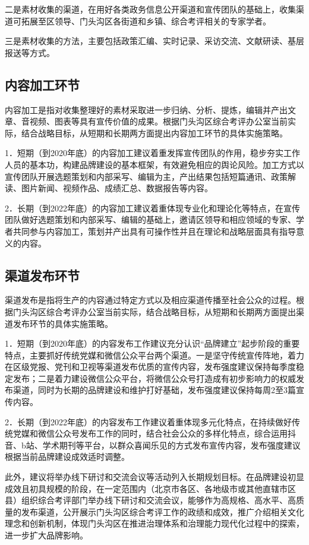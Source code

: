 \documentclass[12pt]{article} %
\begin{document}
二是素材收集的渠道，在用好各类政务信息公开渠道和宣传团队的基础上，收集渠道可拓展至区领导、门头沟区各街道和乡镇、综合考评相关的专家学者。

三是素材收集的方法，主要包括政策汇编、实时记录、采访交流、文献研读、基层报送等方式。

\subsection{内容加工环节}
内容加工是指对收集整理好的素材采取进一步归纳、分析、提炼，编辑并产出文章、音视频、图表等具有宣传价值的成果。根据门头沟区综合考评办公室当前实际，结合战略目标，从短期和长期两方面提出内容加工环节的具体实施策略。

1．短期（到2020年底）的内容加工建议着重发挥宣传团队的作用，稳步夯实工作人员的基本功，构建品牌建设的基本框架，有效避免相应的舆论风险。加工方式以宣传团队开展选题策划和内部采写、编辑为主，产出结果包括短篇通讯、政策解读、图片新闻、视频作品、成绩汇总、数据报告等内容。

2．长期（到2022年底）的内容加工建议着重体现专业化和理论化等特点，在宣传团队做好选题策划和内部采写、编辑的基础上，邀请区领导和相应领域的专家、学者共同参与内容加工，策划并产出具有可操作性并且在理论和战略层面具有指导意义的内容。

\subsection{渠道发布环节}
渠道发布是指将生产的内容通过特定方式以及相应渠道传播至社会公众的过程。根据门头沟区综合考评办公室当前实际，结合战略目标，从短期和长期两方面提出渠道发布环节的具体实施策略。

1．短期（到2020年底）的内容发布工作建议充分认识“品牌建立”起步阶段的重要特点，主要抓好传统党媒和微信公众平台两个渠道。一是坚守传统宣传阵地，着力在区级党报、党刊和卫视等渠道发布优质的宣传内容，发布强度建议保持每季度稳定发布；二是着力建设微信公众平台，将微信公众号打造成有初步影响力的权威发布渠道，同时为长期的品牌建设和维护打好基础，发布强度建议保持每周2至3篇宣传内容。

2．长期（到2022年底）的内容发布工作建议着重体现多元化特点，在持续做好传统党媒和微信公众号发布工作的同时，结合社会公众的多样化特点，综合运用抖音、b站、学术期刊等平台，以群众喜闻乐见的方式发布宣传内容，发布强度建议根据当前品牌建设成效适时调整。

此外，建议将举办线下研讨和交流会议等活动列入长期规划目标。在品牌建设初显成效且初具规模的阶段，在一定范围内（北京市各区、各地级市或其他直辖市区县）组织综合考评部门举办线下研讨和交流会议，能够作为高规格、高水平、高质量的发布渠道，公开展示门头沟区综合考评工作的政绩和成效，推广介绍相关文化理念和创新机制，体现门头沟区在推进治理体系和治理能力现代化过程中的探索，进一步扩大品牌影响。
\end{document}
